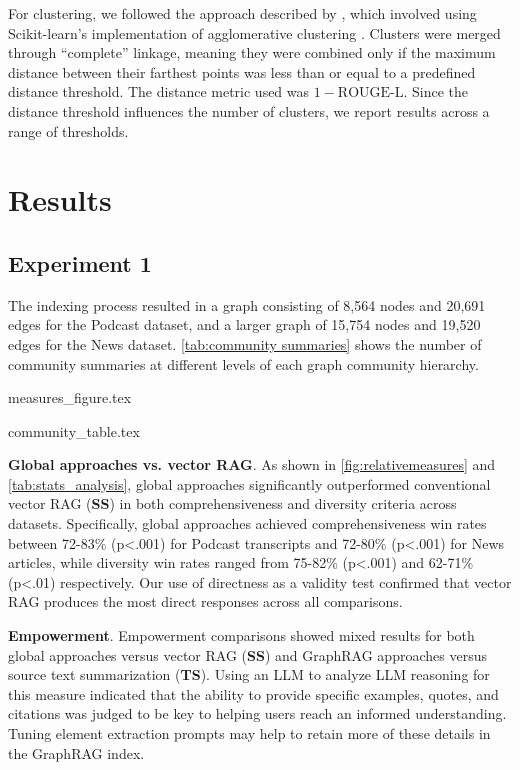 \documentclass{article}
\begin{document}
For clustering, we followed the approach described by \citet{padmakumar}, which involved using Scikit-learn’s implementation of agglomerative clustering \citep{perdregosa}. Clusters were merged through “complete” linkage, meaning they were combined only if the maximum distance between their farthest points was less than or equal to a predefined distance threshold. The distance metric used was $1 - \text{ROUGE-L}$. Since the distance threshold influences the number of clusters, we report results across a range of thresholds.

\section{Results}

\subsection{Experiment 1}

The indexing process resulted in a graph consisting of 8,564 nodes and 20,691 edges for the Podcast dataset, and a larger graph of 15,754 nodes and 19,520 edges for the News dataset.
\autoref{tab:community summaries} shows the number of community summaries at different levels of each graph community hierarchy.

{measures_figure.tex}

{community_table.tex}

\textbf{Global approaches vs. vector RAG}. As shown in \autoref{fig:relativemeasures} and \autoref{tab:stats_analysis}, global approaches significantly outperformed conventional vector RAG (\textbf{SS}) in both comprehensiveness and diversity criteria across datasets.
Specifically, global approaches achieved comprehensiveness win rates between 72-83\% (p\textless .001) for Podcast transcripts and 72-80\% (p\textless.001) for News articles, while diversity win rates ranged from 75-82\% (p\textless.001) and 62-71\% (p\textless.01) respectively.
Our use of directness as a validity test confirmed that vector RAG produces the most direct responses across all comparisons. 

\textbf{Empowerment}. Empowerment comparisons showed mixed results for both global approaches versus vector RAG (\textbf{SS}) and GraphRAG approaches versus source text summarization (\textbf{TS}).
Using an LLM to analyze LLM reasoning for this measure indicated that the ability to provide specific examples, quotes, and citations was judged to be key to helping users reach an informed understanding.
Tuning element extraction prompts may help to retain more of these details in the GraphRAG index.
\end{document}
